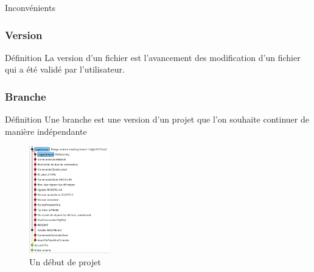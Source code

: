 \begin{frame}
\begin{block}
{\begin{block}{Inconvénients}
				\end{block}
			}
			
			
			
		 
		\end{block}
	\end{frame}


	\begin{frame}
	\frametitle{Version}
		\begin{block}{Définition}
			La version d'un fichier est l'avancement des modification d'un fichier qui a été validé par l'utilisateur.
		\end{block}
	\end{frame}

	\begin{frame}
		\frametitle{Branche}
		\begin{block}{Définition}
			Une branche est une version d'un projet que l'on souhaite continuer de manière indépendante 
		\end{block}
		\begin{figure}
			\centering
			\includegraphics[width=35mm]{./Img/DefBranches.png}
			\caption{Un début de projet}
		\end{figure}
	\end{frame}